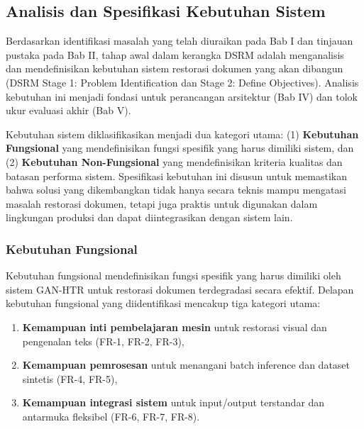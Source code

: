 % 
%

\subsection{Analisis dan Spesifikasi Kebutuhan Sistem}
\label{subsec:requirements-analysis}

Berdasarkan identifikasi masalah yang telah diuraikan pada Bab I dan tinjauan pustaka pada Bab II, tahap awal dalam kerangka DSRM adalah menganalisis dan mendefinisikan kebutuhan sistem restorasi dokumen yang akan dibangun (DSRM Stage 1: Problem Identification dan Stage 2: Define Objectives). Analisis kebutuhan ini menjadi fondasi untuk perancangan arsitektur (Bab IV) dan tolok ukur evaluasi akhir (Bab V).

Kebutuhan sistem diklasifikasikan menjadi dua kategori utama: (1) \textbf{Kebutuhan Fungsional} yang mendefinisikan fungsi spesifik yang harus dimiliki sistem, dan (2) \textbf{Kebutuhan Non-Fungsional} yang mendefinisikan kriteria kualitas dan batasan performa sistem. Spesifikasi kebutuhan ini disusun untuk memastikan bahwa solusi yang dikembangkan tidak hanya secara teknis mampu mengatasi masalah restorasi dokumen, tetapi juga praktis untuk digunakan dalam lingkungan produksi dan dapat diintegrasikan dengan sistem lain.

\subsubsection{Kebutuhan Fungsional}
\label{subsubsec:functional-requirements}

Kebutuhan fungsional mendefinisikan fungsi spesifik yang harus dimiliki oleh sistem GAN-HTR untuk restorasi dokumen terdegradasi secara efektif. Delapan kebutuhan fungsional yang diidentifikasi mencakup tiga kategori utama:

\begin{enumerate}
    \item \textbf{Kemampuan inti pembelajaran mesin} untuk restorasi visual dan pengenalan teks (FR-1, FR-2, FR-3),
    \item \textbf{Kemampuan pemrosesan} untuk menangani batch inference dan dataset sintetis (FR-4, FR-5),
    \item \textbf{Kemampuan integrasi sistem} untuk input/output terstandar dan antarmuka fleksibel (FR-6, FR-7, FR-8).
\end{enumerate}

